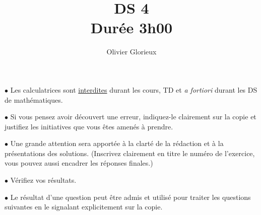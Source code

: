 \documentclass[a4paper, 11pt,reqno]{article}
\author{Olivier Glorieux}
\begin{document}
\title{DS 4\\
\Large{Durée 3h00}
}

\vspace{1cm}
\begin{center}

\begin{description}
\item$\bullet$ Les calculatrices sont \underline{interdites} durant les cours, TD et \emph{a fortiori} durant les DS de mathématiques. \\

\item $\bullet $ Si vous pensez avoir découvert une erreur, indiquez-le clairement sur la copie et justifiez les initiatives que vous êtes amenés à prendre. \\

\item $\bullet$ Une grande attention sera apportée à la clarté de la rédaction et à la présentations des solutions. (Inscrivez clairement en titre le numéro de l'exercice, vous pouvez aussi encadrer les réponses finales.)  \\

\item $\bullet$ Vérifiez vos résultats. \\

\item $\bullet$ Le résultat d'une question peut être admis et utilisé pour traiter les questions suivantes en le signalant explicitement sur la copie. 
\end{description}

\end{center} 
\vspace{1cm}


%


\newpage
\end{document}
